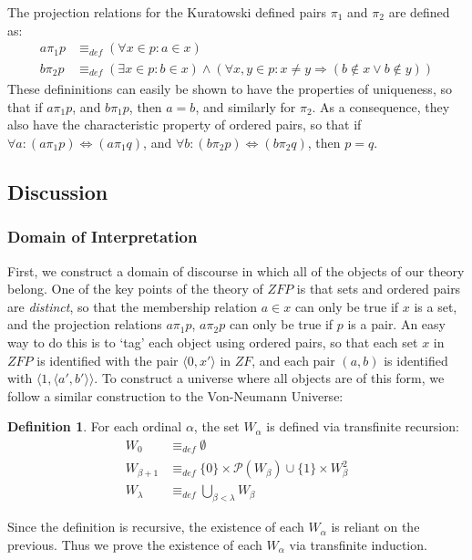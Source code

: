\documentclass[11pt]{report}
\newcommand{\eqdef}{\equiv_\mathit{def}}
\newcommand{\pleft}{\mathrel{\pi_1}}
\newcommand{\pright}{\mathrel{\pi_2}}
\newcommand{\pair}[2]{\langle #1,#2 \rangle}
\theoremstyle{definition}
\theoremstyle{theorem}
\theoremstyle{lemma}
\newtheorem{definition}{Definition}[section]
\begin{document}
The projection relations for the Kuratowski defined pairs $\pleft$ and $\pright$ are defined as:
\begin{align*}
a\pleft p &\eqdef (\forall x\in p: a\in x) \\
b\pright p &\eqdef (\exists x\in p: b\in x) \wedge
                (\forall x,y \in p: x\neq y \Rightarrow (b\notin x \vee b\notin y))
\end{align*}
These defininitions can easily be shown to have the properties of uniqueness, so that if $a\pleft p$, and $b\pleft p$, then $a=b$, and similarly for $\pright$. As a consequence, they also have the characteristic property of ordered pairs, so that if $\forall a: (a\pleft p)\Leftrightarrow(a\pleft q)$, and $\forall b: (b\pright p)\Leftrightarrow(b\pright q)$, then $p=q$.

\subsection{Discussion}\label{zfpmodel}

\subsubsection{Domain of Interpretation}
First, we construct a domain of discourse in which all of the objects of our theory belong.
One of the key points of the theory of $\mathit{ZFP}$ is that sets and ordered pairs are \emph{distinct}, so that the membership relation $a\in x$ can only be true if $x$ is a set, and the projection relations $a\pleft p$, $a\pright p$ can only be true if $p$ is a pair.
An easy way to do this is to `tag' each object using ordered pairs, so that each set $x$ in $\mathit{ZFP}$ is identified with the pair $\pair{0}{x'}$ in $\mathit{ZF}$, and each pair $(a,b)$ is identified with $\pair{1}{\pair{a'}{b'}}$. To construct a universe where all objects are of this form, we follow a similar construction to the Von-Neumann Universe:

\begin{definition} For each ordinal $\alpha$, the set $W_\alpha$ is defined via transfinite recursion:
\begin{align*}
 W_0 &\eqdef \emptyset\\
 W_{\beta+1} &\eqdef \{0\}\times\mathcal{P}(W_\beta) \cup \{1\}\times W_\beta^2 \\
 W_\lambda &\eqdef \bigcup_{\beta < \lambda} W_\beta
\end{align*}
\end{definition}
\noindent
Since the definition is recursive, the existence of each $W_\alpha$ is reliant on the previous. Thus we prove the existence of each $W_\alpha$ via transfinite induction.
\end{document}

